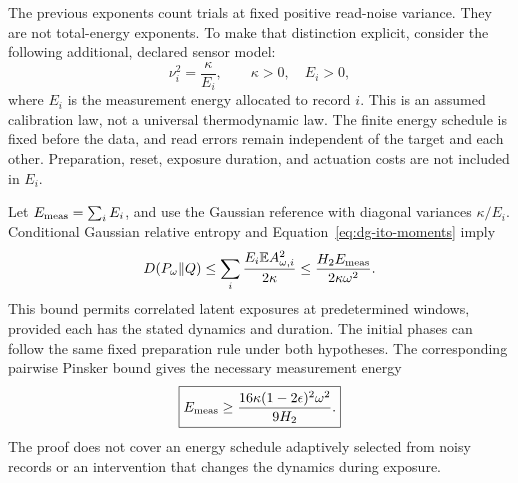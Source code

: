 The previous exponents count trials at fixed positive read-noise variance.
They are not total-energy exponents. To make that distinction explicit,
consider the following additional, declared sensor model:
\begin{equation}
 \nu_i^2=\frac{\kappa}{E_i},\qquad \kappa>0,
 \quad E_i>0,
 \label{eq:dg-sensor-energy-law}
\end{equation}
where $E_i$ is the measurement energy allocated to record $i$. This is an
assumed calibration law, not a universal thermodynamic law. The finite
energy schedule is fixed before the data, and read errors remain independent
of the target and each other. Preparation, reset, exposure duration, and
actuation costs are not included in $E_i$.

Let $E_{\rm meas}=\sum_iE_i$, and use the Gaussian reference with diagonal
variances $\kappa/E_i$. Conditional Gaussian relative entropy and
Equation~\eqref{eq:dg-ito-moments} imply
\begin{equation}
 D(P_\omega\Vert Q)
 \leq\sum_i\frac{E_i\mathbb E A_{\omega,i}^2}{2\kappa}
 \leq\frac{H_2E_{\rm meas}}{2\kappa\omega^2}.
 \label{eq:dg-energy-kl}
\end{equation}
This bound permits correlated latent exposures at predetermined windows,
provided each has the stated dynamics and duration. The initial phases can
follow the same fixed preparation rule under both hypotheses. The
corresponding pairwise Pinsker bound gives the necessary measurement energy
\begin{equation}
 \boxed{\displaystyle
 E_{\rm meas}\geq
 \frac{16\kappa(1-2\epsilon)^2\omega^2}{9H_2}.}
 \label{eq:dg-energy-necessary}
\end{equation}
The proof does not cover an energy schedule adaptively selected from noisy
records or an intervention that changes the dynamics during exposure.

